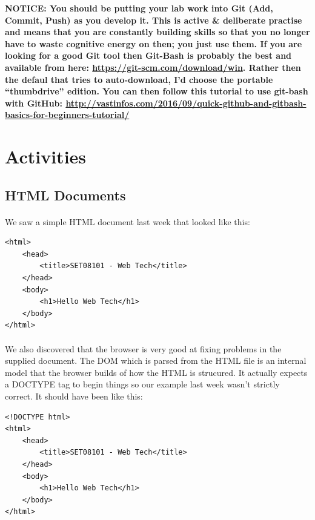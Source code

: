 \documentclass[10pt, a4paper, twosize]{article}
\begin{document}
\begin{framed}
{\bf{NOTICE:} You should be putting your lab work into Git (Add, Commit, Push) as you develop it. This is active \& deliberate practise and means that you are constantly building skills so that you no longer have to waste cognitive energy on then; you just use them. If you are looking for a good Git tool then Git-Bash is probably the best and available from here: \url{https://git-scm.com/download/win}. Rather then the defaul that tries to auto-download, I'd choose the portable ``thumbdrive'' edition. You can then follow this tutorial to use git-bash with GitHub: \url{http://vastinfos.com/2016/09/quick-github-and-gitbash-basics-for-beginners-tutorial/} }
\end{framed}


\section{Activities}

\subsection{HTML Documents}
\paragraph{} We saw a simple HTML document last week that looked like this:

\begin{lstlisting}
<html>
    <head>
        <title>SET08101 - Web Tech</title>
    </head>
    <body>
        <h1>Hello Web Tech</h1>
    </body>
</html>
\end{lstlisting}

\paragraph{} We also discovered that the browser is very good at fixing problems in the supplied document. The DOM which is parsed from the HTML file is an internal model that the browser builds of how the HTML is strucured. It actually expects a DOCTYPE tag to begin things so our example last week wasn't strictly correct. It should have been like this:

\begin{lstlisting}
<!DOCTYPE html>
<html>
    <head>
        <title>SET08101 - Web Tech</title>
    </head>
    <body>
        <h1>Hello Web Tech</h1>
    </body>
</html>
\end{lstlisting}
\end{document}
